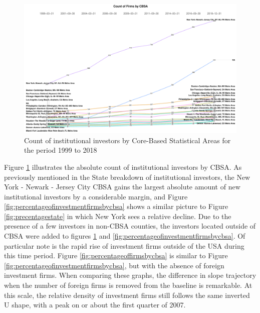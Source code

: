 \begin{figure}[h]
	\centering
	\includegraphics[width=1\linewidth]{Figures/ChapterIII/Count_by_CBSA_Legal}
	\caption[Count of Institutional Investors by CBSA]{Count of institutional investors by Core-Based Statistical Areas for the period 1999 to 2018}
	\label{fig:countbycbsalegal}
\end{figure}

Figure \ref{fig:countbycbsalegal} illustrates the absolute count of institutional investors by CBSA.  As previously mentioned in the State breakdown of institutional investors, the New York - Newark - Jersey City CBSA gains the largest absolute amount of new institutional investors by a considerable margin, and Figure \ref{fig:percentageofinvestmentfirmsbycbsa} shows a similar picture to Figure \ref{fig:precentagestate} in which New York sees a relative decline.  Due to the presence of a few investors in non-CBSA counties, the investors located outside of CBSA were added to figures \ref{fig:countbycbsalegal} and \ref{fig:percentageofinvestmentfirmsbycbsa}.  Of particular note is the rapid rise of investment firms outside of the USA during this time period.  Figure \ref{fig:percentageoffirmsbycbsa} is similar to Figure \ref{fig:percentageofinvestmentfirmsbycbsa}, but with the absence of foreign investment firms. When comparing these graphs, the difference in slope trajectory when the number of foreign firms is removed from the baseline is remarkable.   At this scale, the relative density of investment firms still follows the same inverted U shape, with a peak on or about the first quarter of 2007.  




